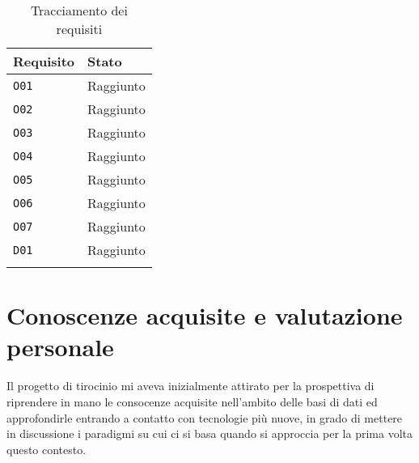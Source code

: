 \begin{center}
    
    \renewcommand{\arraystretch}{1.5}
    
    \centering
    \begin{longtable}{| C{2.5cm} | C{4cm} |}
        
        \hline
        
        \textbf{Requisito} &  \textbf{Stato} \\
        
        \hline
        
        \texttt{O01} & Raggiunto \\
        
        \hline 
        
        \texttt{O02} & Raggiunto \\
        
        \hline 
        
        \texttt{O03} & Raggiunto \\
        
        \hline 
        
        \texttt{O04} & Raggiunto \\
        
        \hline
        
        \texttt{O05} & Raggiunto  \\
        
        \hline 
        
        \texttt{O06} & Raggiunto \\
        
        \hline 
        
        \texttt{O07} & Raggiunto  \\
        
        \hline 
        
        \texttt{D01} & Raggiunto  \\
        
        \hline 
        
        \caption{Tracciamento dei requisiti}\label{tab:tracciamento}
    \end{longtable}
    
    
\end{center}


\section{Conoscenze acquisite e valutazione personale}
Il progetto di tirocinio mi aveva inizialmente attirato per la prospettiva di riprendere in mano le consocenze acquisite nell'ambito delle basi di dati ed approfondirle entrando a contatto con tecnologie più nuove, in grado di mettere in discussione i paradigmi su cui ci si basa quando si approccia per la prima volta questo contesto.\\

